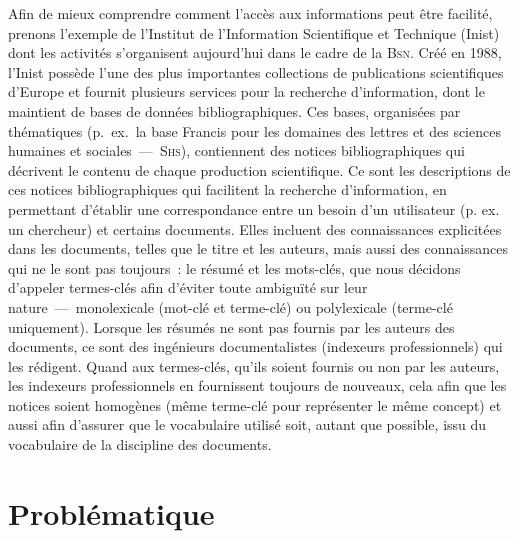       Afin de mieux comprendre comment l'accès aux informations peut être
      facilité, prenons l'exemple de l'Institut de l'Information Scientifique et
      Technique (Inist) dont les activités s'organisent aujourd'hui dans le
      cadre de la \textsc{Bsn}. Créé en 1988, l'Inist possède l'une des plus
      importantes collections de publications scientifiques d'Europe et fournit
      plusieurs services pour la recherche d'information, dont le maintient de
      bases de données bibliographiques. Ces bases, organisées par thématiques
      (p.~ex.~la base Francis pour les domaines des lettres et des sciences
      humaines et sociales~---~\textsc{Shs}), contiennent des notices
      bibliographiques qui décrivent le contenu de chaque production
      scientifique. Ce sont les descriptions de ces notices bibliographiques qui
      facilitent la recherche d'information, en permettant d'établir une
      correspondance entre un besoin d'un utilisateur (p. ex. un chercheur) et
      certains documents. Elles incluent des connaissances explicitées dans les
      documents, telles que le titre et les auteurs, mais aussi des
      connaissances qui ne le sont pas toujours~: le résumé et les mots-clés,
      que nous décidons d'appeler termes-clés afin d'éviter toute ambiguïté sur
      leur nature~---~monolexicale (mot-clé et terme-clé) ou polylexicale
      (terme-clé uniquement). Lorsque les résumés ne sont pas fournis par les
      auteurs des documents, ce sont des ingénieurs documentalistes (indexeurs
      professionnels) qui les rédigent. Quand aux termes-clés, qu'ils soient
      fournis ou non par les auteurs, les indexeurs professionnels en
      fournissent toujours de nouveaux, cela afin que les notices soient
      homogènes (même terme-clé pour représenter le même concept) et aussi afin
      d'assurer que le vocabulaire utilisé soit, autant que possible, issu du
      vocabulaire de la discipline des documents.




    \section{Problématique}

